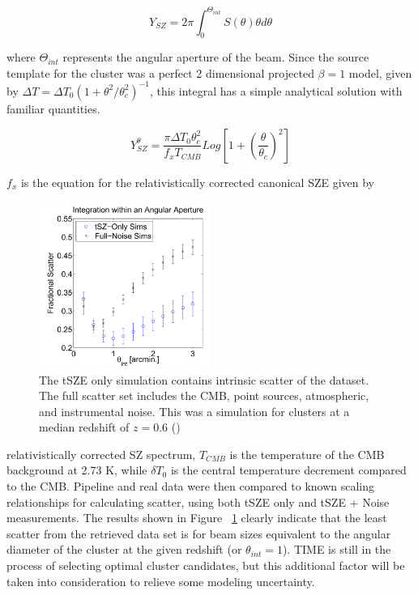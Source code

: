 \documentclass[manuscript]{aastex}
\begin{document}
\begin{equation}
Y_{SZ} = 2\pi \int_{0}^{\Theta_{int}} S(\theta) \theta d\theta
\end{equation}

where $\Theta_{int}$ represents the angular aperture of the beam. Since the source template for the cluster was a perfect 2 dimensional projected $\beta = 1$ model, given by $\Delta T = \Delta T_{0}(1 + \theta^{2}/\theta_{c}^{2})^{-1}$, this integral has a simple analytical solution with familiar quantities. 

\begin{equation}
Y_{SZ}^{\theta} = \frac{\pi \Delta T_{0} \theta_{c}^{2}}{f_{x} T_{CMB}} Log[1 + (\frac{\theta}{\theta_{c}})^{2}]
\end{equation}

$f_{x}$ is the equation for the relativistically corrected canonical SZE given by 
\begin{figure}
\vspace{-0.8cm}
  \begin{center}
    \includegraphics[width=0.5\textwidth]{saliwanchick1.png}
   \end{center}
\caption[MCMC Cluster Simulation Showing Scatter Versus Integration Angle -(\cite{Saliwanchik2015})]{The tSZE only simulation contains intrinsic scatter of the dataset. The full scatter set includes the CMB, point sources, atmospheric, and instrumental noise. This was a simulation for clusters at a median redshift of $z = 0.6$ (\cite{Saliwanchik2015})}
\label{fig:sali1}
\end{figure}
relativistically corrected SZ spectrum, $T_{CMB}$ is the temperature of the CMB background at 2.73 K, while $\delta T_{0}$ is the central temperature decrement compared to the CMB. Pipeline and real data were then compared to known scaling relationships for calculating scatter, using both tSZE only and tSZE + Noise measurements. The results shown in Figure ~\ref{fig:sali1} clearly indicate that the least scatter from the retrieved data set is for beam sizes equivalent to the angular diameter of the cluster at the given redshift (or \(\theta_{int} = 1\)). TIME is still in the process of selecting optimal cluster candidates, but this additional factor will be taken into consideration to relieve some modeling uncertainty.  
\end{document}
